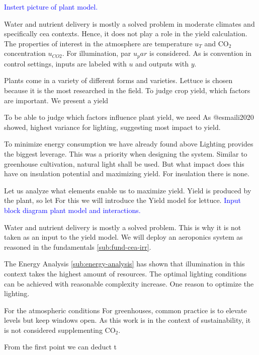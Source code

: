 
\textcolor{Blue}{Instert picture of plant model.}

Water and nutrient delivery is mostly a solved problem in moderate climates and specifically \ac{cea} contexts.
Hence, it does not play a role in the yield calculation.
The properties of interest in the atmosphere are temperature $u_T$ and CO$_2$ concentration $u_{CO2}$.
For illumination, \ac{par} $u_par$ is considered.
As is convention in control settings, inputs are labeled with $u$ and outputs with $y$.



Plants come in a variety of different forms and varieties.
Lettuce is chosen because it is the most researched in the field.
To judge crop yield, which factors are important.
We present a yield 

To be able to judge which factors influence plant yield, we need
As @esmaili2020 showed, highest variance for lighting, suggesting most impact to yield.

To minimize energy consumption we have already found above 
Lighting provides the biggest leverage.
This was a priority when designing the system.
Similar to greenhouse cultivation, natural light shall be used.
But what impact does this have on insulation potential and maximizing yield.
For insulation there is none.

Let us analyze what elements enable us to maximize yield.
Yield is produced by the plant, so let 
For this we will introduce the Yield model for lettuce.
\textcolor{Blue}{Input block diagram plant model and interactions.}

Water and nutrient delivery is mostly a solved problem.
This is why it is not taken as an input to the yield model.
We will deploy an aeroponics system as reasoned in the fundamentals \ref{sub:fund-cea-irr}.

The Energy Analysis \ref{sub:energy-analysis} has shown that illumination in this context takes the highest amount of resources.
The optimal lighting conditions can be achieved with reasonable complexity increase.
One reason to optimize the lighting.

For the atmospheric conditions
For greenhouses, common practice is to elevate levels but keep windows open.
As this work is in the context of sustainability, it is not considered supplementing CO$_2$.

From the first point we can deduct t

